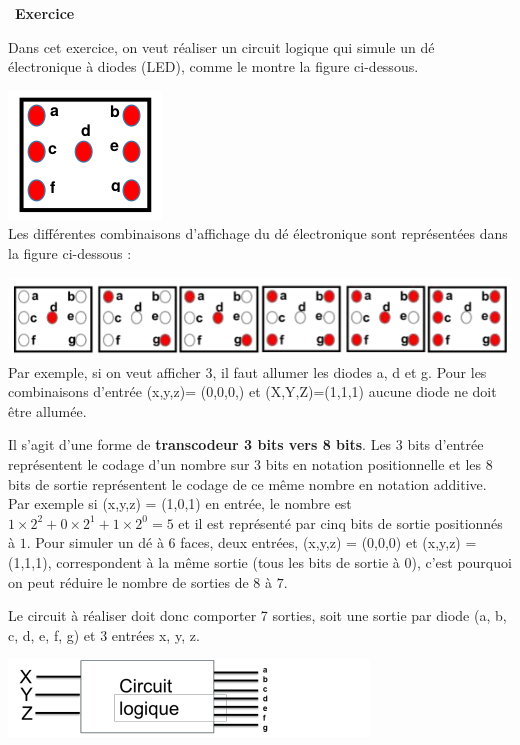 \documentclass[
  11pt,
]{article}
\newcounter{exo}
\newenvironment{exercice}[1]
{\par \medskip   \addtocounter{exo}{1} \noindent  
\begin{bclogo}[arrondi =0.1,   noborder = true, logo=\bccrayon, marge=4]{~\textbf{Exercice} \textbf{\theexo} {\itshape #1} }  \par}
{
\end{bclogo}
 \par \bigskip }
\newcounter{logi}
\begin{document}
\begin{exercice}{}

Dans cet exercice, on veut réaliser un circuit logique qui simule un dé
électronique à diodes (LED), comme le montre la figure ci-dessous.

\includegraphics{images/de.png}\\

Les différentes combinaisons d'affichage du dé électronique sont
représentées dans la figure ci-dessous :

\includegraphics{images/faces_de.png}\\

Par exemple, si on veut afficher 3, il faut allumer les diodes a, d et
g. Pour les combinaisons d'entrée (x,y,z)= (0,0,0,) et (X,Y,Z)=(1,1,1)
aucune diode ne doit être allumée.

Il s'agit d'une forme de \textbf{transcodeur 3 bits vers 8 bits}. Les
\(3\) bits d'entrée représentent le codage d'un nombre sur \(3\) bits en
notation positionnelle et les \(8\) bits de sortie représentent le
codage de ce même nombre en notation additive. Par exemple si (x,y,z) =
(1,0,1) en entrée, le nombre est
\(1 \times 2^{2} + 0 \times 2^{1} + 1 \times 2^{0}=5\) et il est
représenté par cinq bits de sortie positionnés à \(1\). Pour simuler un
dé à 6 faces, deux entrées, (x,y,z) = (0,0,0) et (x,y,z) = (1,1,1),
correspondent à la même sortie (tous les bits de sortie à 0), c'est
pourquoi on peut réduire le nombre de sorties de \(8\) à \(7\).

Le circuit à réaliser doit donc comporter 7 sorties, soit une sortie par
diode (a, b, c, d, e, f, g) et 3 entrées x, y, z.

\includegraphics{images/circuit-de.png}\\


\end{exercice}
\end{document}
